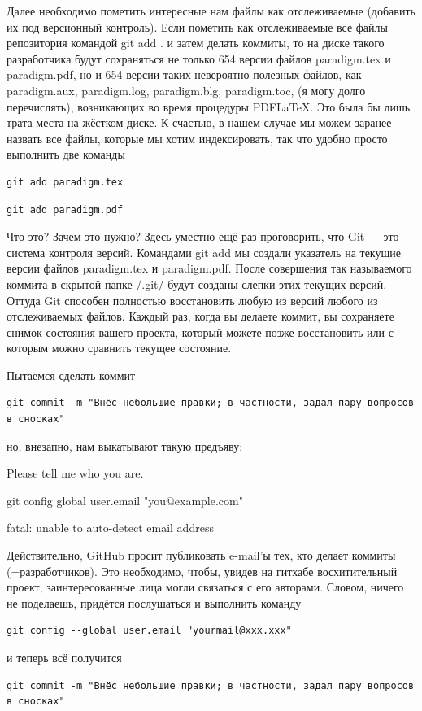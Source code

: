 \documentclass[11pt]{article}
\theoremstyle{remark}
\theoremstyle{definition}
\begin{document}
Далее необходимо пометить интересные нам файлы как отслеживаемые (добавить их под версионный контроль). Если пометить как отслеживаемые все файлы репозитория командой git add . и затем делать коммиты, то на диске такого разработчика будут сохраняться не только 654 версии файлов paradigm.tex и paradigm.pdf, но и 654 версии таких невероятно полезных файлов, как paradigm.aux, paradigm.log, paradigm.blg, paradigm.toc, (я могу долго перечислять), возникающих во время процедуры PDF\LaTeX. Это была бы лишь трата места на жёстком диске. К счастью, в нашем случае мы можем заранее назвать все файлы, которые мы хотим индексировать, так что удобно просто выполнить две команды
\begin{verbatim}git add paradigm.tex\end{verbatim}
\begin{verbatim}git add paradigm.pdf\end{verbatim}

Что это? Зачем это нужно? Здесь уместно ещё раз проговорить, что Git --- это система контроля версий. Командами git add мы создали указатель на текущие версии файлов paradigm.tex и paradigm.pdf. После совершения так называемого коммита в скрытой папке /.git/ будут созданы слепки этих текущих версий. Оттуда Git способен полностью восстановить любую из версий любого из отслеживаемых файлов. Каждый раз, когда вы делаете коммит, вы сохраняете снимок состояния вашего проекта, который можете позже восстановить или с которым можно сравнить текущее состояние.

Пытаемся сделать коммит\begin{verbatim}git commit -m "Внёс небольшие правки; в частности, задал пару вопросов в сносках"\end{verbatim}
но, внезапно, нам выкатывают такую предъяву:

Please tell me who you are.

git config \text{-}\text{-}global user.email "you@example.com"

fatal: unable to auto-detect email address

\bigskip

Действительно, GitHub просит публиковать e-mail'ы тех, кто делает коммиты (=разработчиков). Это необходимо, чтобы, увидев на гитхабе восхитительный проект, заинтересованные лица могли связаться с его авторами. Словом, ничего не поделаешь, придётся послушаться и выполнить команду
\begin{verbatim}git config --global user.email "yourmail@xxx.xxx"\end{verbatim}
и теперь всё получится
\begin{verbatim}git commit -m "Внёс небольшие правки; в частности, задал пару вопросов в сносках"\end{verbatim}
\end{document}
